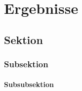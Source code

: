 \chapter{Ergebnisse}
\label{ch:Ergebnisse}





\section{Sektion}
\lipsum[1]




\subsection{Subsektion}
\lipsum[1]



\subsubsection{Subsubsektion}
\lipsum[1-5]